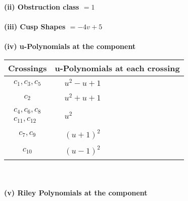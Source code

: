 \documentclass[1p]{elsarticle_modified}
\theoremstyle{definition}
\begin{document}
\flushleft \textbf{(ii) Obstruction class $= 1$}\\~\\
\flushleft \textbf{(iii) Cusp Shapes $= -4 v+5$}\\~\\
\newpage\renewcommand{\arraystretch}{1}
\flushleft \textbf{(iv) u-Polynomials at the component}\newline \\
\begin{tabular}{m{50pt}|m{274pt}}
Crossings & \hspace{64pt}u-Polynomials at each crossing \\
\hline $$\begin{aligned}c_{1},c_{3},c_{5}\end{aligned}$$&$\begin{aligned}
&u^2- u+1
\end{aligned}$\\
\hline $$\begin{aligned}c_{2}\end{aligned}$$&$\begin{aligned}
&u^2+u+1
\end{aligned}$\\
\hline $$\begin{aligned}c_{4},c_{6},c_{8}\\c_{11},c_{12}\end{aligned}$$&$\begin{aligned}
&u^2
\end{aligned}$\\
\hline $$\begin{aligned}c_{7},c_{9}\end{aligned}$$&$\begin{aligned}
&(u+1)^2
\end{aligned}$\\
\hline $$\begin{aligned}c_{10}\end{aligned}$$&$\begin{aligned}
&(u-1)^2
\end{aligned}$\\
\hline
\end{tabular}\\~\\
\newpage\renewcommand{\arraystretch}{1}
\flushleft \textbf{(v) Riley Polynomials at the component}\newline \\
\end{document}
